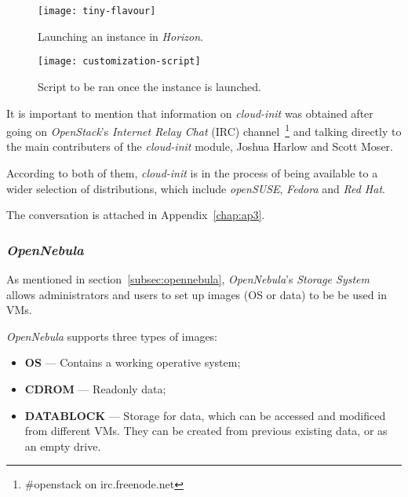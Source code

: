 \begin{figure}[h]
  \begin{center}
    \leavevmode
    \texttt{[image: tiny-flavour]}
    \caption{Launching an instance in \textit{Horizon}.}
    \label{fig:tiny-flavour}
  \end{center} 
\end{figure}


\begin{figure}[h]
  \begin{center}
    \leavevmode
    \texttt{[image: customization-script]}
    \caption{Script to be ran once the instance is launched.}
    \label{fig:customization-script}
  \end{center} 
\end{figure}


It is important to mention that information on \textit{cloud-init} was obtained after going on \textit{OpenStack}'s \textit{Internet Relay Chat} (IRC) channel~\footnote{\#openstack on irc.freenode.net} and talking directly to the main contributers of the \textit{cloud-init} module, Joshua Harlow and Scott Moser.

According to both of them, \textit{cloud-init} is in the process of being available to a wider selection of distributions, which include \textit{openSUSE}, \textit{Fedora} and \textit{Red Hat}. 

The conversation is attached in Appendix~\ref{chap:ap3}.

\subsubsection{\textit{OpenNebula}}

As mentioned in section~\ref{subsec:opennebula}, \textit{OpenNebula}'s \textit{Storage System} allows administrators and users to set up images (OS or data) to be be used in VMs. 

\textit{OpenNebula} supports three types of images:

\begin{itemize}
\item \textbf{OS} --- Contains a working operative system;
\item \textbf{CDROM} --- Readonly data;
\item \textbf{DATABLOCK} --- Storage for data, which can be accessed and modificed from different VMs. They can be created from previous existing data, or as an empty drive.
\end{itemize}

